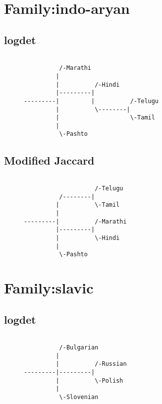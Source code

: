 \section{Family:indo-aryan}
\subsection{logdet}
\begin{figure}[!htb]
\begin{center}
{
\selectfont
\begin{verbatim}

          /-Marathi
         |
         |          /-Hindi
         |---------|
---------|         |          /-Telugu
         |          \--------|
         |                    \-Tamil
         |
          \-Pashto

\end{verbatim}
}
\label{...}
\end{center}
\end{figure}
\subsection{Modified Jaccard}
\begin{figure}[!htb]
\begin{center}
{
\selectfont
\begin{verbatim}

                    /-Telugu
          /--------|
         |          \-Tamil
         |
---------|          /-Marathi
         |---------|
         |          \-Hindi
         |
          \-Pashto

\end{verbatim}
}
\label{...}
\end{center}
\end{figure}
\section{Family:slavic}
\subsection{logdet}
\begin{figure}[!htb]
\begin{center}
{
\selectfont
\begin{verbatim}

          /-Bulgarian
         |
         |          /-Russian
---------|---------|
         |          \-Polish
         |
          \-Slovenian

\end{verbatim}
}
\label{...}
\end{center}
\end{figure}
